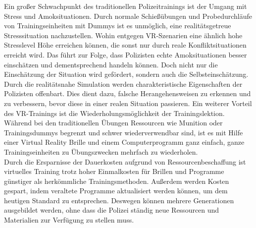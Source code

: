 Ein großer Schwachpunkt des traditionellen Polizeitrainings ist der Umgang mit Stress und Amoksituationen. Durch normale Schießübungen und Probedurchläufe von Trainingseinheiten mit Dummys ist es unmöglich, eine realitätsgetreue Stresssituation nachzustellen. Wohin entgegen VR-Szenarien eine ähnlich hohe Stresslevel Höhe erreichen können, die sonst nur durch reale Konfliktsituationen erreicht wird. Das führt zur Folge, dass Polizisten echte Amoksituationen besser einschätzen und dementsprechend handeln können. Doch nicht nur die Einschätzung der Situation wird gefördert, sondern auch die Selbsteinschätzung. Durch die realitätsnahe Simulation werden charakteristische Eigenschaften der Polizisten offenbart. Dies dient dazu, falsche Herangehensweisen zu erkennen und zu verbessern, bevor diese in einer realen Situation passieren. Ein weiterer Vorteil des VR-Trainings ist die Wiederholungsmöglichkeit der Trainingslektion. Während bei den traditionellen Übungen Ressourcen wie Munition oder Trainingsdummys begrenzt und schwer wiederverwendbar sind, ist es mit Hilfe einer Virtual Reality Brille und einem Computerprogramm ganz einfach, ganze Trainingseinheiten zu Übungszwecken mehrfach zu wiederholen. \cite{kleygrewe2024virtual}
\\
Durch die Ersparnisse der Dauerkosten aufgrund von Ressourcenbeschaffung ist virtuelles Training trotz hoher Einmalkosten für Brillen und Programme günstiger als herkömmliche Trainingsmethoden. Außerdem werden Kosten gespart, indem veraltete Programme aktualisiert werden können, um dem heutigen Standard zu entsprechen. Deswegen können mehrere Generationen ausgebildet werden, ohne dass die Polizei ständig neue Ressourcen und Materialien zur Verfügung zu stellen muss. \cite{heltne2023cost}
